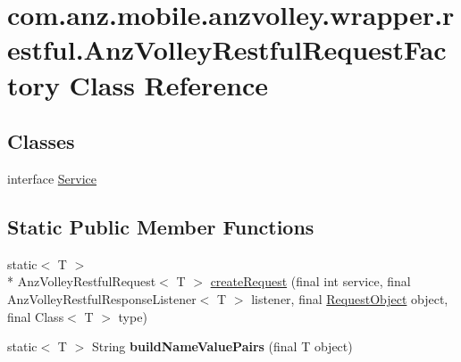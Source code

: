 \hypertarget{classcom_1_1anz_1_1mobile_1_1anzvolley_1_1wrapper_1_1restful_1_1_anz_volley_restful_request_factory}{\section{com.\+anz.\+mobile.\+anzvolley.\+wrapper.\+restful.\+Anz\+Volley\+Restful\+Request\+Factory Class Reference}
\label{classcom_1_1anz_1_1mobile_1_1anzvolley_1_1wrapper_1_1restful_1_1_anz_volley_restful_request_factory}
}
\subsection*{Classes}
\begin{DoxyCompactItemize}
\item 
interface \hyperlink{interfacecom_1_1anz_1_1mobile_1_1anzvolley_1_1wrapper_1_1restful_1_1_anz_volley_restful_request_factory_1_1_service}{Service}
\end{DoxyCompactItemize}
\subsection*{Static Public Member Functions}
\begin{DoxyCompactItemize}
\item 
static$<$ T $>$\\*
 Anz\+Volley\+Restful\+Request$<$ T $>$ \hyperlink{classcom_1_1anz_1_1mobile_1_1anzvolley_1_1wrapper_1_1restful_1_1_anz_volley_restful_request_factory_a5aed8fb22ed5137a4661d7ebb407e094}{create\+Request} (final int service, final Anz\+Volley\+Restful\+Response\+Listener$<$ T $>$ listener, final \hyperlink{classcom_1_1anz_1_1mobile_1_1anzvolley_1_1wrapper_1_1json_1_1_request_object}{Request\+Object} object, final Class$<$ T $>$ type)
\item 
\hypertarget{classcom_1_1anz_1_1mobile_1_1anzvolley_1_1wrapper_1_1restful_1_1_anz_volley_restful_request_factory_a06e7b903ddd2e9d82805611d6e714e90}{static$<$ T $>$ String {\bfseries build\+Name\+Value\+Pairs} (final T object)}\label{classcom_1_1anz_1_1mobile_1_1anzvolley_1_1wrapper_1_1restful_1_1_anz_volley_restful_request_factory_a06e7b903ddd2e9d82805611d6e714e90}

\end{DoxyCompactItemize}


